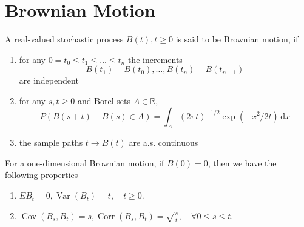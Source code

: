 \chapter{Brownian Motion}

\begin{definition}
    A real-valued stochastic process $B(t),t\geq 0$ is said to be Brownian motion, if
    \begin{enumerate}
        \item for any $0=t_{0}\leq t_{1}\leq\ldots\leq t_{n}$ the increments
              \begin{equation*}
                  B\left(t_{1}\right)-B\left(t_{0}\right),\ldots,B\left(t_{n}\right)-B\left(t_{n-1}\right)
              \end{equation*}
              are independent
        \item for any $s,t\geq 0$ and Borel sets $A\in\mathbb{R}$,
              \begin{equation}
                  P\left(B(s+t)-B(s)\in A\right)=\int_{A}(2\pi t)^{-1/2}\exp\left(-x^{2}/2t\right)\,\mathrm{d}x
              \end{equation}
        \item the sample paths $t\rightarrow B(t)$ are a.s. continuous
    \end{enumerate}
\end{definition}

\begin{property}
    For a one-dimensional Brownian motion, if $B(0)=0$, then we have the following properties
    \begin{enumerate}
        \item $EB_{t}=0,\operatorname{Var}\left(B_{t}\right)=t,\quad t\geq 0$.
        \item $\operatorname{Cov}\left(B_{s},B_{t}\right)=s,\operatorname{Corr}\left(B_{s},B_{t}\right)=\sqrt{\frac{s}{t}},\quad\forall 0\leq s\leq t$.
    \end{enumerate}
\end{property}

